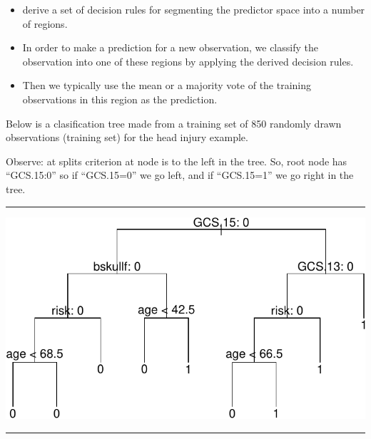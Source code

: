 \documentclass[]{article}
\providecommand{\tightlist}{%
  \setlength{\itemsep}{0pt}\setlength{\parskip}{0pt}}
\begin{document}
\begin{itemize}
\tightlist
\item
  derive a set of decision rules for segmenting the predictor space into
  a number of regions.
\item
  In order to make a prediction for a new observation, we classify the
  observation into one of these regions by applying the derived decision
  rules.
\item
  Then we typically use the mean or a majority vote of the training
  observations in this region as the prediction.
\end{itemize}

Below is a clasification tree made from a training set of 850 randomly
drawn observations (training set) for the head injury example.

Observe: at splits criterion at node is to the left in the tree. So,
root node has ``GCS.15:0'' so if ``GCS.15=0'' we go left, and if
``GCS.15=1'' we go right in the tree.

\begin{center}\rule{0.5\linewidth}{\linethickness}\end{center}

\includegraphics{8Trees_files/figure-latex/unnamed-chunk-2-1.pdf}

\begin{center}\rule{0.5\linewidth}{\linethickness}\end{center}

\footnotesize
\end{document}
